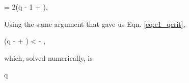 \eqbegin
{} = 2\left(q - 1 + \right)\frac{\dot{\Md}}{\Md}.
\label{eq:c1_adotovera2}
\eqend

\noindent Using the same argument that gave us Eqn. \ref{eq:c1_qcrit},

(q -  + ) < - ,
\label{eq:c1_qcrit2}
\eqend

\noindent which, solved numerically, is

\eqbegin
q 
\label{eq:c1_qcrit3}
\eqend



